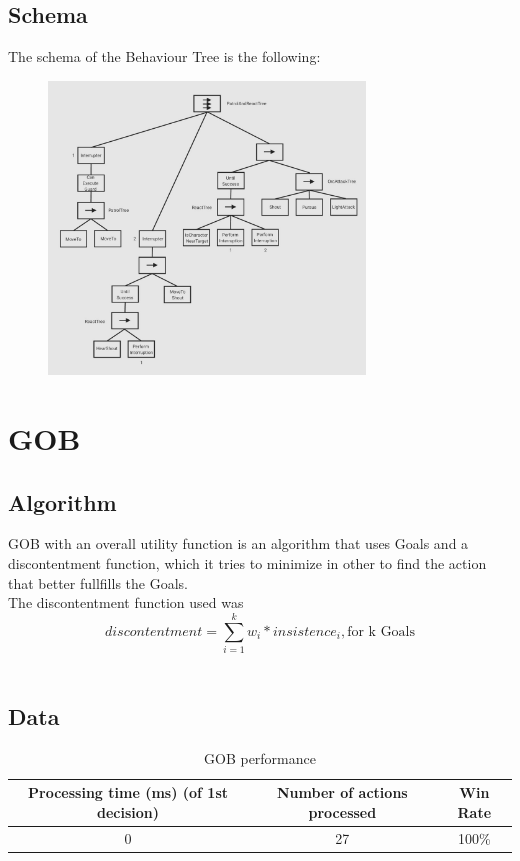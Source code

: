 \documentclass{article}
\begin{document}
  \subsection{Schema}
  The schema of the Behaviour Tree is the following:
  \begin{figure}[h]
    \centering
    \includegraphics[width=0.75\textwidth ]{Schema.jpg}
  \end{figure}
  \section{GOB}
  \subsection{Algorithm}
  GOB with an overall utility function is an algorithm that uses Goals and a discontentment function, which it tries to minimize in other to find the action that better fullfills the Goals. \\
  The discontentment function used was \[discontentment = \sum_{i=1}^{k}w_i * insistence_i, \text{for k Goals}\]\\ 
  \subsection{Data}
  \begin{table}[h!]
    \centering
    \caption{GOB performance}
    \label{tab:tableGOB1}
    \begin{tabular}{c|c|c}
      \textbf{Processing time (ms) (of 1st decision)} & \textbf{Number of actions processed} & \textbf{Win Rate}\\
      \hline
      0 & 27 & 100\%
    \end{tabular}
  \end{table}
\end{document}
